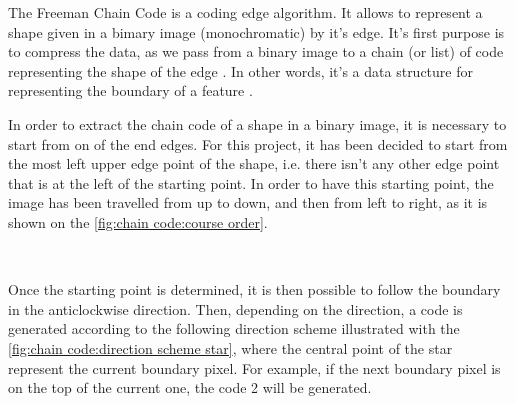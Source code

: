 

The Freeman Chain Code is a coding edge algorithm. It allows to represent a shape given in a bimary image (monochromatic) by it's edge. It's first purpose is to compress the data, as we pass from a binary image to a chain (or list) of code representing the shape of the edge \cite{bib:chain:ParametreGeometriqueChaineFreeman}. In other words, it's a data structure for representing the boundary of a feature \cite{bib:chain:DigitalImageProcessing}.

In order to extract the chain code of a shape in a binary image, it is necessary to start from on of the end edges. For this project, it has been decided to start from the most left upper edge point of the shape, i.e. there isn't any other edge point that is at the left of the starting point. In order to have this starting point, the image has been travelled from up to down, and then from left to right, as it is shown on the \vref{fig:chain code:course order}.


~~


Once the starting point is determined, it is then possible to follow the boundary in the anticlockwise direction. Then, depending on the direction, a code is generated according to the following direction scheme illustrated with the \vref{fig:chain code:direction scheme star}, where the central point of the star represent the current boundary pixel. For example, if the next boundary pixel is on the top of the current one, the code 2 will be generated. 


